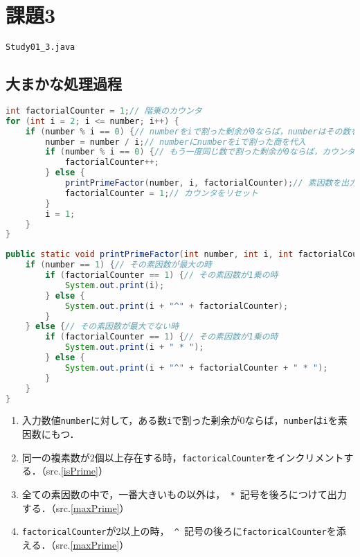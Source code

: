 \documentclass[a4j,11pt]{jsarticle}
\begin{document}
\newpage
\setcounter{section}{3}
\setcounter{subsection}{0}

\section*{課題3}
\noindent{}\hspace{1em}\verb|Study01_3.java|
\subsection{大まかな処理過程}
\begin{lstlisting}[caption=ある数に対して素数か否か判定する, label=isPrime, language=Java]
int factorialCounter = 1;// 階乗のカウンタ
for (int i = 2; i <= number; i++) {
    if (number % i == 0) {// numberをiで割った剰余が0ならば，numberはその数を素因数にもつ
        number = number / i;// numberにnumberをiで割った商を代入
        if (number % i == 0) {// もう一度同じ数で割った剰余が0ならば，カウンタをインクリメント
            factorialCounter++;
        } else {
            printPrimeFactor(number, i, factorialCounter);// 素因数を出力するメソッドへ．
            factorialCounter = 1;// カウンタをリセット
        }
        i = 1;
    }
}
\end{lstlisting}
\begin{lstlisting}[caption=その素数が最大であるか判断する, label=maxPrime, language=Java]
public static void printPrimeFactor(int number, int i, int factorialCounter) {
    if (number == 1) {// その素因数が最大の時
        if (factorialCounter == 1) {// その素因数が1乗の時
            System.out.print(i);
        } else {
            System.out.print(i + "^" + factorialCounter);
        }
    } else {// その素因数が最大でない時
        if (factorialCounter == 1) {// その素因数が1乗の時
            System.out.print(i + " * ");
        } else {
            System.out.print(i + "^" + factorialCounter + " * ");
        }
    }
}
\end{lstlisting}
\begin{enumerate}
\renewcommand{\labelenumi}{\arabic{enumi})}
\item 入力数値\verb|number|に対して，ある数\verb|i|で割った剰余が$0$ならば，\verb|number|は\verb|i|を素因数にもつ．
\item 同一の複素数が$2$個以上存在する時，\verb|factoricalCounter|をインクリメントする．（src.\ref{isPrime}）
\item 全ての素因数の中で，一番大きいもの以外は，\verb| * |記号を後ろにつけて出力する．（src.\ref{maxPrime}）
\item \verb|factoricalCounter|が$2$以上の時，\verb| ^ |記号の後ろに\verb|factoricalCounter|を添える．（src.\ref{maxPrime}）
\end{enumerate}
\newpage
\end{document}
